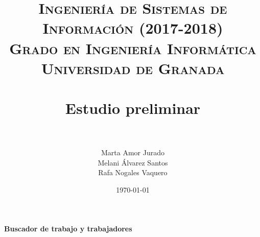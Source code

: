 


\title{	
\normalfont \normalsize 
\textsc{\textbf{Ingeniería de Sistemas de Información (2017-2018)} \\ Grado en Ingeniería Informática \\ Universidad de Granada} \\ [25pt] %
\horrule{0.5pt} \\[0.4cm] %
\huge Estudio preliminar \\ %
\horrule{2pt} \\[0.5cm]
}

\author{Marta Amor Jurado \\ Melani Álvarez Santos \\ Rafa Nogales Vaquero} %

\date{\normalsize\today} %



\maketitle
\newpage 
\tableofcontents
\newpage
\setlength{\parindent}{1cm}


\section{}

\begin{center}
	\textbf{Buscador de trabajo y trabajadores}
\end{center}



